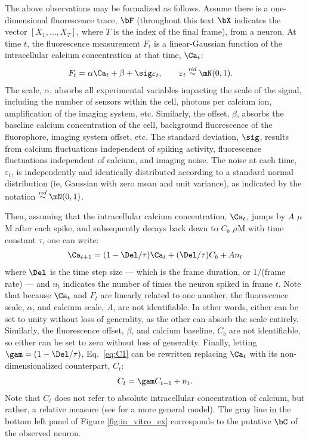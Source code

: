 The above observations may be formalized as follows. Assume there is a one-dimensional fluorescence trace, $\bF$ (throughout this text $\bX$ indicates the vector $[X_1, \ldots, X_T]$, where $T$ is the index of the final frame), from a neuron.  At time $t$, the fluorescence measurement $F_t$ is a linear-Gaussian function of the intracellular calcium concentration at that time, $\Ca_t$:
\begin{align} \label{eq:F}
F_t &= \alpha \Ca_t + \beta + \sig \varepsilon_t, \qquad \varepsilon_t \overset{iid}{\sim} \mN(0,1).
\end{align}
\noindent The scale, $\alpha$, absorbs all experimental variables impacting the scale of the signal, including the number of sensors within the cell, photons per calcium ion, amplification of the imaging system, etc.  Similarly, the offset, $\beta$, absorbs the baseline calcium concentration of the cell, background fluorescence of the fluorophore, imaging system offset, etc.  The standard deviation, $\sig$, results from calcium fluctuations independent of spiking activity, fluorescence fluctuations independent of calcium, and imaging noise. The noise at each time, $\varepsilon_t$, is independently and identically distributed according to a standard normal distribution (ie, Gaussian with zero mean and unit variance), as indicated by the notation $\overset{iid}{\sim}\mN(0,1)$. 

Then, assuming that the intracellular calcium concentration, $\Ca_t$, jumps by $A$ $\mu$M after each spike, and subsequently decays back down to $C_b$ $\mu$M with time constant $\tau$, one can write:
\begin{align} \label{eq:C1}
\Ca_{t+1} = (1- \Del/\tau ) \Ca_t + (\Del/\tau) C_b + A n_t
\end{align}
\noindent where $\Del$ is the time step size --- which is the frame duration, or $1/$(frame rate) --- and $n_t$ indicates the number of times the neuron spiked in frame $t$. %
Note that because $\Ca_t$ and $F_t$ are linearly related to one another, the fluorescence scale, $\alpha$, and calcium scale, $A$, are not identifiable.  In other words, either can be set to unity without loss of generality, as the other can absorb the scale entirely. Similarly, the fluorescence offset, $\beta$, and calcium baseline, $C_b$ are not identifiable, so either can be set to zero without loss of generality.  Finally, letting $\gam=(1-\Del/\tau)$, Eq.~\eqref{eq:C1} can be rewritten replacing $\Ca_t$ with its non-dimensionalized counterpart, $C_t$: 
\begin{align} \label{eq:C2}
	 C_t =\gam C_{t-1} + n_t.
\end{align} 
\noindent Note that $C_t$ does not refer to absolute intracellular concentration of calcium, but rather, a relative measure (see \cite{VogelsteinPaninski09} for a more general model).  The gray line in the bottom left panel of Figure \ref{fig:in_vitro_ex} corresponds to the putative $\bC$ of the observed neuron.  

